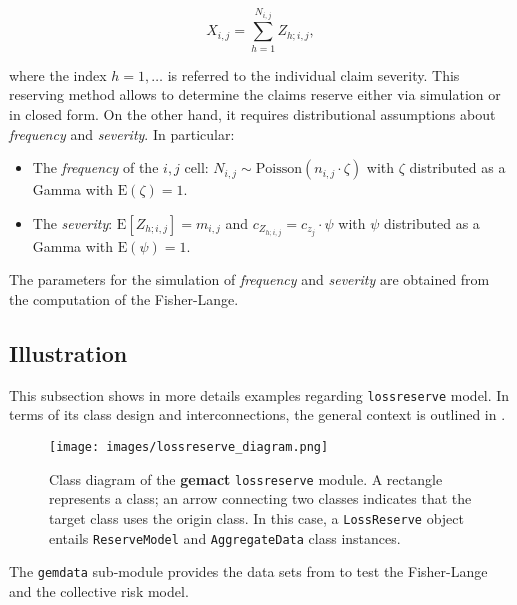 \documentclass{article}
\begin{document}
\begin{itemize}
    \begin{equation}
    \label{eq:crmreserving}
        X_{i,j}=\sum_{h=1}^{N_{i,j}} Z_{h;i,j},
    \end{equation}
    
    where the index $h=1, \ldots$ is referred to the individual claim severity.
    This reserving method allows to determine the claims reserve either via simulation or in closed form. On the other hand, it requires distributional assumptions about \textit{frequency} and \textit{severity}. In particular:
    
\begin{itemize}
    \item The \textit{frequency} of the $i,j$ cell: $N_{i,j} \sim \text{Poisson}\left(n_{i,j}\cdot \zeta \right)$ with $\zeta$ distributed as a Gamma with $\mathrm{E}\left(\zeta \right)=1$.
    
    \item The \textit{severity}: $\mathrm{E}[Z_{h;i,j}]=m_{i,j}$ and $c_{Z_{h;i,j}}=c_{z_j} \cdot \psi$ with $\psi$ distributed as a Gamma with $\mathrm{E}\left(\psi\right)=1$.
\end{itemize}
    The parameters for the simulation of \textit{frequency} and \textit{severity} are obtained from the computation of the Fisher-Lange.
    
\end{itemize}

\subsection{Illustration}

This subsection shows in more details examples regarding \texttt{lossreserve} model. In terms of its class design and interconnections, the general context is outlined in .

\begin{figure}
\centering
    \texttt{[image: images/lossreserve\_diagram.png]}
    \caption{Class diagram of the \textbf{gemact} \texttt{lossreserve} module. A rectangle represents a class; an arrow connecting two classes indicates that the target class uses the origin class. In this case, a \texttt{LossReserve} object entails \texttt{ReserveModel} and \texttt{AggregateData} class instances.}
    \label{fig:lossreservediagram}
\end{figure}

The \texttt{gemdata} sub-module provides the data sets from \cite{savelliDATA} to test the Fisher-Lange and the collective risk model. 
\end{document}
